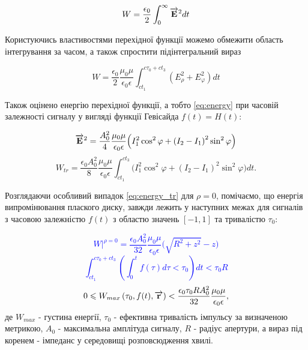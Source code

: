 \begin{equation} \label{eq:energy}
W = \frac{\epsilon_0}{2} \int_0^\infty \overrightarrow{\mathbf E}^2 dt
\end{equation}

Користуючись властивостями перехідної функції можемо обмежити
область інтегрування за часом, а також спростити підінтегральний вираз

\begin{equation} \label{eq:energy}
W = \frac{\epsilon_0}{2} \frac{\mu_0 \mu}{\epsilon_0 \epsilon}
\int_{ct_1}^{c\tau_0+ct_3} \left( E_\rho^2 + E_\varphi^2 \right) dt
\end{equation}

Також оцінено енергію перехідної функції, а тобто \ref{eq:energy} при 
часовій залежності сигналу у вигляді функції Гевісайда $ f(t) = H(t) $:

\textcolor{blue}{ \begin{equation*} \begin{aligned}
\overrightarrow{\mathbf E}^2 = \frac{A_0^2}{4} \frac{\mu_0 \mu}{\epsilon_0 \epsilon}
\Big( I_1^2 \cos^2 \varphi + \left( I_2 - I_1 \right)^2 \sin^2 \varphi \Big)
\end{aligned} \end{equation*} }
%
\begin{equation} \label{eq:energy_tr}
W_{tr} = \frac{\epsilon_0 A_0^2}{8} \frac{\mu_0 \mu}{\epsilon_0 \epsilon}
\int_{ct_1}^{ct_3}  \Big( I_1^2 \cos^2 \varphi + 
\left( I_2 - I_1 \right)^2 \sin^2 \varphi \Big) dt.
\end{equation}

Розглядаючи особливий випадок \ref{eq:energy_tr} для $ \rho = 0 $, помічаємо,
що енергія випромінювання плаского диску, завжди лежить у наступних межах для 
сигналів з часовою залежністю $ f(t) $ з областю значень 
$ \left[ -1, 1 \right] $ та тривалістю $ \tau_0 $:

\textcolor{blue}{ \begin{equation*}
\left. W \right|^{\rho=0} = \frac{\epsilon_0 A_0^2}{32} 
\frac{\mu_0 \mu}{\epsilon_0 \epsilon} \Big( \sqrt{R^2+z^2} - z \Big)
\end{equation*} }
%
\textcolor{blue}{ \begin{equation*}
\int_{ct_1}^{c\tau_0+ct_3} 
\left( \int_0^t f(\tau) d \tau < \tau_0 \right) dt < \tau_0 R
\end{equation*} }
%
\begin{equation}
0 \leqslant W_{max} \left( \tau_0, f(t), \overrightarrow{\mathbf r} \right) < 
\frac{\epsilon_0 \tau_0 R A_0^2}{32} \frac{\mu_0 \mu}{\epsilon_0 \epsilon},
\end{equation}
%
де $ W_{max} $ - густина енергії, $ \tau_0 $ - ефективна тривалість імпульсу 
за визначеною метрикою, $ A_0 $ - максимальна амплітуда сигналу, $ R $ - 
радіус апертури, а вираз під коренем - імпеданс у середовищі розповсюдження 
хвилі.

